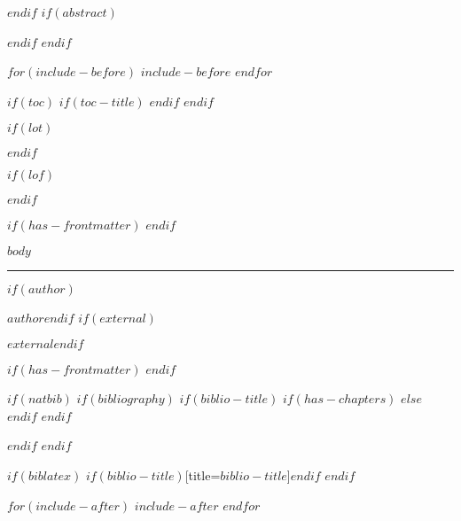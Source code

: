 \documentclass[
$if(fontsize)$$fontsize$,$endif$%
$if(lang)$$babel-lang$,$endif$%
$if(papersize)$$papersize$paper,$endif$%
$for(classoption)$$classoption$$sep$,$endfor$]%
{article}%
\begin{document}
$endif$
$if(abstract)$
\begin{abstract}
$abstract$
\end{abstract}
$endif$
$endif$

$for(include-before)$
$include-before$
$endfor$

$if(toc)$
$if(toc-title)$
\renewcommand*\contentsname{$toc-title$}
$endif$
$endif$

$if(lot)$
\listoftables
$endif$

$if(lof)$
\listoffigures
$endif$

$if(has-frontmatter)$
\mainmatter
$endif$

$body$


\vspace{10pt}\vfill\hrule
\begin{description}
$if(author)$\item[Course Responsible:] $author$$endif$
$if(external)$\item[External Examiner:] $external$$endif$
\end{description}

$if(has-frontmatter)$
\backmatter
$endif$

$if(natbib)$
$if(bibliography)$
$if(biblio-title)$
$if(has-chapters)$
\renewcommand\bibname{$biblio-title$}
$else$
\renewcommand\refname{$biblio-title$}
$endif$ %
$endif$ %

$endif$ %
$endif$ %

$if(biblatex)$
\printbibliography$if(biblio-title)$[title=$biblio-title$]$endif$
$endif$

$for(include-after)$
$include-after$
$endfor$
\end{document}
